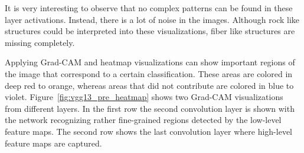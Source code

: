 \begin{figure}[!h]
\label{fig:vgg13_fromscratch_filters}
\end{figure}

It is very interesting to observe that no complex patterns can be found in these layer activations. Instead, there is a lot of noise in the images. Although rock like structures could be interpreted into these visualizations, fiber like structures are missing completely.

\newpage

Applying Grad-CAM and heatmap visualizations can show important regions of the image that correspond to a certain classification. These areas are colored in deep red to orange, whereas areas that did not contribute are colored in blue to violet. Figure~\ref{fig:vgg13_pre_heatmap} shows two Grad-CAM visualizations from different layers. In the first row the second convolution layer is shown with the network recognizing rather fine-grained regions detected by the low-level feature maps. The second row shows the last convolution layer where high-level feature maps are captured. \\


